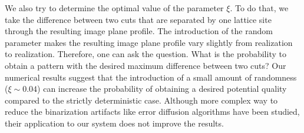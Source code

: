 We also try to determine the optimal value of the parameter $\xi$. To do that, we take the difference between two cuts that are separated by one lattice site through the resulting image plane profile. The introduction of the random parameter makes the resulting image plane profile vary slightly from realization to realization. Therefore, one can ask the question. What is the probability to obtain a pattern with the desired maximum difference between two cuts? Our numerical results suggest that the introduction of a small amount of randomness ($\xi \sim 0.04$) can increase the probability of obtaining a desired potential quality compared to the strictly deterministic case. Although more complex way to reduce the binarization artifacts like error diffusion algorithms \cite{floyd, Hu2018} have been studied, their application to our system does not improve the results. 

